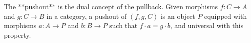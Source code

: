 The **pushout** is the dual concept of the pullback. Given morphisms $f: C \longrightarrow A$ and $g: C \longrightarrow B$ in a category, a pushout of $(f, g, C)$ is an object $P$ equipped with morphisms $a: A \longrightarrow P$ and $b: B \longrightarrow P$ such that $f \cdot a = g \cdot b$, and universal with this property.
